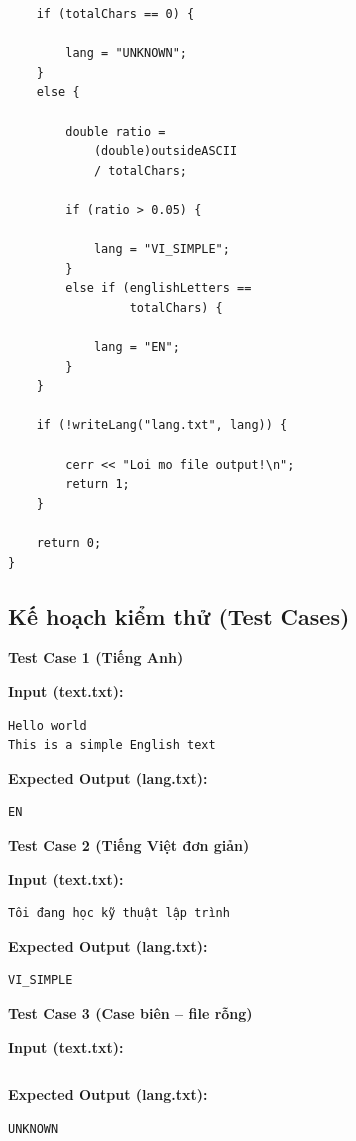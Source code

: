 \begin{lstlisting}
    if (totalChars == 0) {

        lang = "UNKNOWN";
    }
    else {

        double ratio =
            (double)outsideASCII
            / totalChars;

        if (ratio > 0.05) {

            lang = "VI_SIMPLE";
        }
        else if (englishLetters ==
                 totalChars) {

            lang = "EN";
        }
    }

    if (!writeLang("lang.txt", lang)) {

        cerr << "Loi mo file output!\n";
        return 1;
    }

    return 0;
}
\end{lstlisting}

\subsection{Kế hoạch kiểm thử (Test Cases)}

\textbf{Test Case 1 (Tiếng Anh)}

\textbf{Input (text.txt):}

\begin{lstlisting}
Hello world
This is a simple English text
\end{lstlisting}

\textbf{Expected Output (lang.txt):}

\begin{lstlisting}
EN
\end{lstlisting}

\vspace{0.5cm}

\textbf{Test Case 2 (Tiếng Việt đơn giản)}

\textbf{Input (text.txt):}

\begin{lstlisting}
Tôi đang học kỹ thuật lập trình
\end{lstlisting}

\textbf{Expected Output (lang.txt):}

\begin{lstlisting}
VI_SIMPLE
\end{lstlisting}

\vspace{0.5cm}

\textbf{Test Case 3 (Case biên -- file rỗng)}

\textbf{Input (text.txt):}

\begin{lstlisting}

\end{lstlisting}

\textbf{Expected Output (lang.txt):}

\begin{lstlisting}
UNKNOWN
\end{lstlisting}